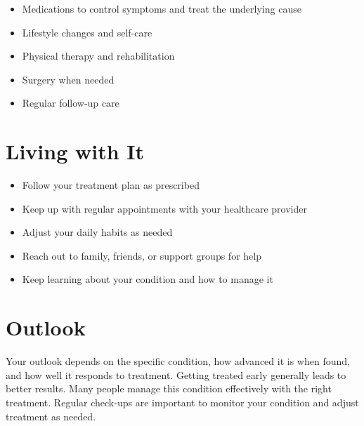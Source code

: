 \begin{itemize}[noitemsep]
  \item Medications to control symptoms and treat the underlying cause
  \item Lifestyle changes and self-care
  \item Physical therapy and rehabilitation
  \item Surgery when needed
  \item Regular follow-up care
\end{itemize}

\section{Living with It}

\begin{itemize}[noitemsep]
  \item Follow your treatment plan as prescribed
  \item Keep up with regular appointments with your healthcare provider
  \item Adjust your daily habits as needed
  \item Reach out to family, friends, or support groups for help
  \item Keep learning about your condition and how to manage it
\end{itemize}

\section{Outlook}
Your outlook depends on the specific condition, how advanced it is when found, and how well it responds to treatment. Getting treated early generally leads to better results. Many people manage this condition effectively with the right treatment. Regular check-ups are important to monitor your condition and adjust treatment as needed.
